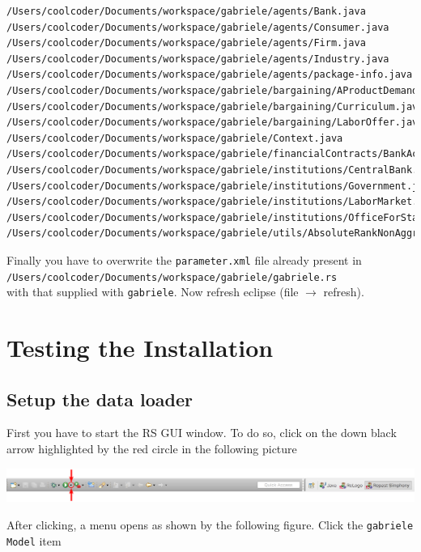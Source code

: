 \documentclass{book}
\begin{document}
\begin{verbatim}
/Users/coolcoder/Documents/workspace/gabriele/agents/Bank.java
/Users/coolcoder/Documents/workspace/gabriele/agents/Consumer.java
/Users/coolcoder/Documents/workspace/gabriele/agents/Firm.java
/Users/coolcoder/Documents/workspace/gabriele/agents/Industry.java
/Users/coolcoder/Documents/workspace/gabriele/agents/package-info.java
/Users/coolcoder/Documents/workspace/gabriele/bargaining/AProductDemand.java
/Users/coolcoder/Documents/workspace/gabriele/bargaining/Curriculum.java
/Users/coolcoder/Documents/workspace/gabriele/bargaining/LaborOffer.java
/Users/coolcoder/Documents/workspace/gabriele/Context.java
/Users/coolcoder/Documents/workspace/gabriele/financialContracts/BankAccount.java
/Users/coolcoder/Documents/workspace/gabriele/institutions/CentralBank.java
/Users/coolcoder/Documents/workspace/gabriele/institutions/Government.java
/Users/coolcoder/Documents/workspace/gabriele/institutions/LaborMarket.java
/Users/coolcoder/Documents/workspace/gabriele/institutions/OfficeForStatistics.java
/Users/coolcoder/Documents/workspace/gabriele/utils/AbsoluteRankNonAggregateDataSource.java
\end{verbatim}

Finally you have to overwrite the \verb+parameter.xml+ file already present in\\  
\verb+/Users/coolcoder/Documents/workspace/gabriele/gabriele.rs+\\
with that supplied with \verb+gabriele+.
\fi
Now refresh eclipse (file $\rightarrow$ refresh).



\section{Testing the Installation}
\subsection{Setup the data loader}


First you have to start the RS GUI window. To do so, click on the down black arrow highlighted by the red circle in the following picture

\noindent
\includegraphics[scale=0.195]{fig_gabriele_rs_execution1a}

After clicking, a menu opens as shown by the following figure. Click the \verb+gabriele Model+ item
\end{document}
